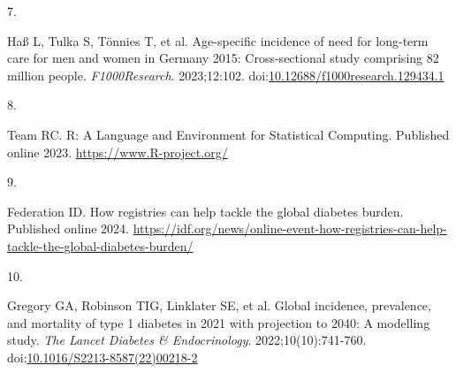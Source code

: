 \documentclass[
  letterpaper,
  DIV=11,
  numbers=noendperiod]{scrartcl}
\newlength{\cslhangindent}
\newlength{\csllabelwidth}
\newenvironment{CSLReferences}[2] %
 {\begin{list}{}{%
  \setlength{\itemindent}{0pt}
  \setlength{\leftmargin}{0pt}
  \setlength{\parsep}{0pt}
  \ifodd #1
   \setlength{\leftmargin}{\cslhangindent}
   \setlength{\itemindent}{-1\cslhangindent}
  \fi
  \setlength{\itemsep}{#2\baselineskip}}}
 {\end{list}}
\newcommand{\CSLLeftMargin}[1]{\parbox[t]{\csllabelwidth}{\strut#1\strut}}
\newcommand{\CSLRightInline}[1]{\parbox[t]{\linewidth - \csllabelwidth}{\strut#1\strut}}
\begin{document}
\begin{CSLReferences}{0}{1}
\CSLLeftMargin{7. }%
\CSLRightInline{Haß L, Tulka S, Tönnies T, et al. Age-specific incidence
of need for long-term care for men and women in {Germany} 2015:
{Cross}-sectional study comprising 82 million people.
\emph{F1000Research}. 2023;12:102.
doi:\href{https://doi.org/10.12688/f1000research.129434.1}{10.12688/f1000research.129434.1}}

\CSLLeftMargin{8. }%
\CSLRightInline{Team RC. R: {A} {Language} and {Environment} for
{Statistical} {Computing}. Published online 2023.
\url{https://www.R-project.org/}}

\CSLLeftMargin{9. }%
\CSLRightInline{Federation ID. How registries can help tackle the global
diabetes burden. Published online 2024.
\url{https://idf.org/news/online-event-how-registries-can-help-tackle-the-global-diabetes-burden/}}

\CSLLeftMargin{10. }%
\CSLRightInline{Gregory GA, Robinson TIG, Linklater SE, et al. Global
incidence, prevalence, and mortality of type 1 diabetes in 2021 with
projection to 2040: A modelling study. \emph{The Lancet Diabetes \&
Endocrinology}. 2022;10(10):741-760.
doi:\href{https://doi.org/10.1016/S2213-8587(22)00218-2}{10.1016/S2213-8587(22)00218-2}}

\end{CSLReferences}
\end{document}
